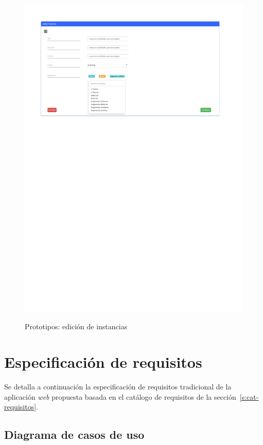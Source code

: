 \begin{figure}[h]
	\caption{Prototipos: edición de instancias}
	\centering
	\includegraphics[width=\textwidth]{../img/anexos/mockups/10-mockups-edit_instance}
	\label{mock:instances-edit}
\end{figure}


\section{Especificación de requisitos}
\label{s:requisitos}

Se detalla a continuación la especificación de requisitos tradicional de la aplicación \textit{web} propuesta basada en el catálogo de requisitos de la sección~\ref{s:cat-requisitos}.

\subsection{Diagrama de casos de uso}
\label{ss:diagrama-casos-uso}

